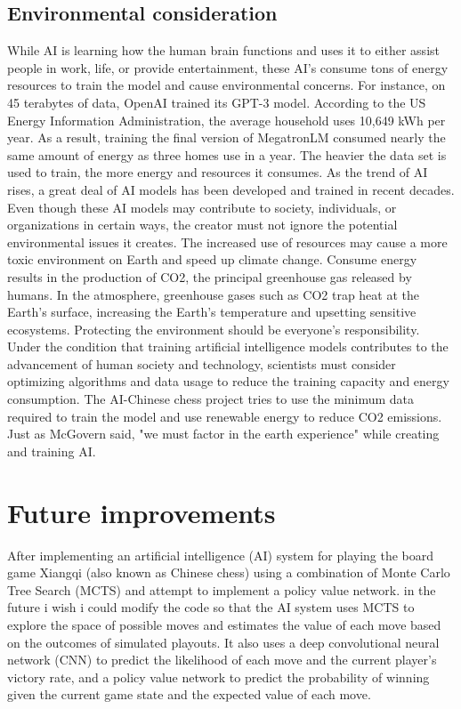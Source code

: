 \documentclass[10pt,twocolumn]{article}
\begin{document}
\subsection{Environmental consideration}
    While AI is learning how the human brain functions and uses it to either assist people in work, life, or provide entertainment, these AI's consume tons of energy resources to train the model and cause environmental concerns. For instance, on 45 terabytes of data, OpenAI trained its GPT-3 model. According to the US Energy Information Administration, the average household uses 10,649 kWh per year. As a result, training the final version of MegatronLM consumed nearly the same amount of energy as three homes use in a year\cite{EnergyConsumption}. The heavier the data set is used to train, the more energy and resources it consumes. As the trend of AI rises, a great deal of AI models has been developed and trained in recent decades. Even though these AI models may contribute to society, individuals, or organizations in certain ways, the creator must not ignore the potential environmental issues it creates. The increased use of resources may cause a more toxic environment on Earth and speed up climate change. Consume energy results in the production of CO2, the principal greenhouse gas released by humans. In the atmosphere, greenhouse gases such as CO2 trap heat at the Earth's surface, increasing the Earth's temperature and upsetting sensitive ecosystems. Protecting the environment should be everyone's responsibility. Under the condition that training artificial intelligence models contributes to the advancement of human society and technology, scientists must consider optimizing algorithms and data usage to reduce the training capacity and energy consumption. The AI-Chinese chess project tries to use the minimum data required to train the model and use renewable energy to reduce CO2 emissions. Just as McGovern said, "we must factor in the earth experience" while creating and training AI.  

\section{Future improvements}
    After implementing an artificial intelligence (AI) system for playing the board game Xiangqi (also known as Chinese chess) using a combination of Monte Carlo Tree Search (MCTS) and attempt to implement a policy value network. in the future i wish i could modify the code so that the AI system uses MCTS to explore the space of possible moves and estimates the value of each move based on the outcomes of simulated playouts. It also uses a deep convolutional neural network (CNN) to predict the likelihood of each move and the current player's victory rate, and a policy value network to predict the probability of winning given the current game state and the expected value of each move.
\end{document}
